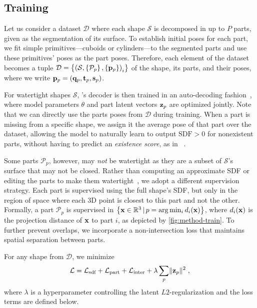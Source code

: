 \subsection{Training}
\label{sec:method-train}



Let us consider a dataset $\mathcal{D}$ where each shape $\mathcal{S}$ is decomposed in up to $P$ parts, given as the segmentation of its surface. To establish initial poses for each part, we fit simple primitives---cuboids or cylinders---to the segmented parts and use these primitives’ poses as the part poses. Therefore, each element of the dataset becomes a tuple $\mathcal{D}=\left\{\left( \mathcal{S}, \left\{\mathcal{P}_p\right\}, \left\{\mathbf{p}_p\right\} \right)_i\right\}$  of the shape, its parts, and their poses, where we write $\mathbf{p}_p=\left( \mathbf{q}_p, \mathbf{t}_p, \mathbf{s}_p \right)$.


For watertight shapes $\mathcal{S}$, \PSDF{}'s decoder is then trained in an auto-decoding fashion~\cite{Park19c}, where model parameters $\theta$ and part latent vectors $\mathbf{z}_p$ are optimized jointly. Note that we can directly use the parts poses from $\mathcal{D}$ during training.
When a part is missing from a specific shape, we assign it the average pose of that part over the dataset, allowing the model to naturally learn to output $\text{SDF} > 0$ for nonexistent parts, without having to predict an \textit{existence score}, as in ~\cite{Petrov23}.

Some parts $\mathcal{P}_p$, however, may \textit{not} be watertight as they are a subset of $\mathcal{S}$'s surface that may not be closed. Rather than computing an approximate SDF or editing the parts to make them watertight~\cite{Wu20c, Petrov23}, we adopt a different supervision strategy. Each part is supervised using the full shape's SDF, but only in the region of space where each 3D point is closest to this part and not the other. Formally, a part $\mathcal{P}_p$ is supervised in $\left\{ \mathbf{x}\in\mathbb{R}^3 \, \vert \, p=\arg\min_i d_i(\mathbf{x}) \right\}$, where $d_i(\mathbf{x})$ is the projection distance of $\mathbf{x}$ to part $i$, as depicted by \cref{fig:method-train}. To further prevent overlaps, we incorporate a non-intersection loss that maintains spatial separation between parts.


For any shape from $\mathcal{D}$, we minimize 
%
\begin{equation}
	\mathcal{L} = \mathcal{L}_\text{sdf} + \mathcal{L}_\text{part} + \mathcal{L}_\text{inter} + \lambda \sum_p \lVert \mathbf{z}_p \rVert^2 \; ,
\end{equation}
%
where $\lambda$ is a hyperparameter controlling the latent $L2$-regularization and the loss terms are defined below.

